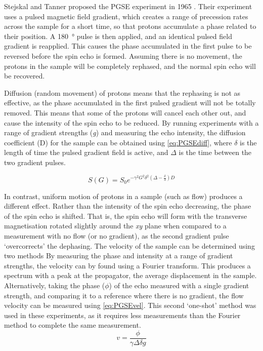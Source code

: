 Stejskal and Tanner proposed the PGSE experiment in 1965 \cite{StejskalSpinDiffusionMeasurements1965}.
Their experiment uses a pulsed magnetic field gradient, which creates a range of precession rates across the sample for a short time, so that protons accumulate a phase related to their position.
A \SI{180}{\degree} pulse is then applied, and an identical pulsed field gradient is reapplied.
This causes the phase accumulated in the first pulse to be reversed before the spin echo is formed.
Assuming there is no movement, the protons in the sample will be completely rephased, and the normal spin echo will be recovered.

Diffusion (random movement) of protons means that the rephasing is not as effective, as the phase accumulated in the first pulsed gradient will not be totally removed.
This means that some of the protons will cancel each other out, and cause the intensity of the spin echo to be reduced.
By running experiments with a range of gradient strengths (\textit{g}) and measuring the echo intensity, the diffusion coefficient (D) for the sample can be obtained using \autoref{eq:PGSEdiff}, where $\delta$ is the length of time the pulsed gradient field is active, and $\Delta$ is the time between the two gradient pulses.

\begin{equation}
S(G) = S_0 e^{-\gamma^2 G^2 \delta^2 (\Delta - \frac{\delta}{3} ) D}
\label{eq:PGSEdiff}
\end{equation}

In contrast, uniform motion of protons in a sample (such as flow) produces a different effect.
Rather than the intensity of the spin echo decreasing, the phase of the spin echo is shifted.
That is, the spin echo will form with the transverse magnetisation rotated slightly around the \textit{xy} plane when compared to a measurement with no flow (or no gradient), as the second gradient pulse `overcorrects' the dephasing.
The velocity of the sample can be determined using two methods \cite{CallaghanVelocitydiffusionimaging1991,XiaOneshotvelocitymicroscopy1992,CallaghanTranslationalDynamicsMagnetic2014}
By measuring the phase and intensity at a range of gradient strengths, the velocity can by found using a Fourier transform.
This produces a spectrum with a peak at the propagator, the average displacement in the sample.
Alternatively, taking the phase ($\phi$) of the echo measured with a single gradient strength, and comparing it to a reference where there is no gradient, the flow velocity can be measured using \autoref{eq:PGSEvel}.
This second `one-shot' method was used in these experiments, as it requires less measurements than the Fourier method to complete the same measurement.
\begin{equation}
v = \frac{\phi}{\gamma \Delta \delta g}
\label{eq:PGSEvel}
\end{equation}

